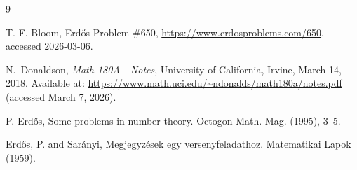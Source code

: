 \documentclass[11pt,letterpaper,reqno]{amsart}
\theoremstyle{definition}
\numberwithin{equation}{section}
\begin{document}
\begin{thebibliography}{9}

T. F. Bloom, Erd\H{o}s Problem \#650, \url{https://www.erdosproblems.com/650}, accessed 2026-03-06.

N.~Donaldson,
\emph{Math 180A - Notes},
University of California, Irvine, March 14, 2018.
Available at:
\url{https://www.math.uci.edu/~ndonalds/math180a/notes.pdf}
(accessed March 7, 2026).


P. Erd\H{o}s, Some problems in number theory. Octogon Math. Mag. (1995), 3--5. 


Erd\H{o}s, P. and Sar\'{a}nyi, Megjegyz\'{e}sek egy versenyfeladathoz. Matematikai Lapok (1959).



\end{thebibliography}
\end{document}
